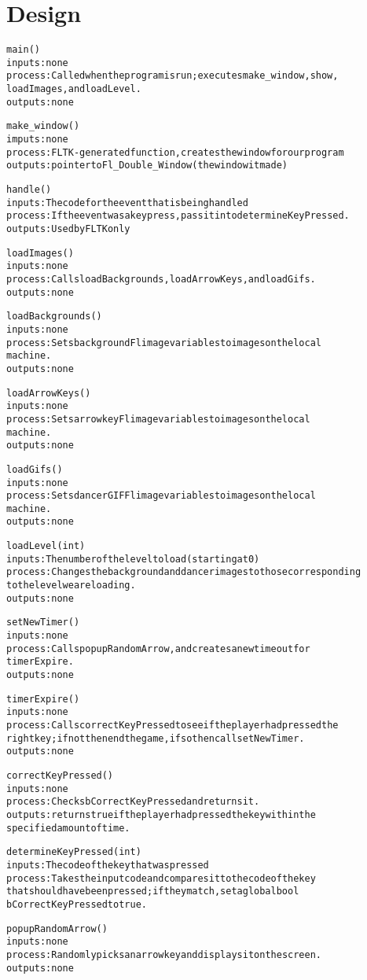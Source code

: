 \documentclass{article}
\begin{document}
\section*{Design}

\begin{alltt}
main()
	inputs: none
	process: Called when the program is run; executes make_window, show,
		loadImages, and loadLevel.
	outputs: none

make_window()
	imputs: none
	process: FLTK-generated function, creates the window for our program
	outputs: pointer to Fl_Double_Window (the window it made)

handle()
	inputs: The code for the event that is being handled
	process: If the event was a keypress, pass it into determineKeyPressed.
	outputs: Used by FLTK only

loadImages()
	inputs: none
	process: Calls loadBackgrounds, loadArrowKeys, and loadGifs.
	outputs: none
\end{alltt}

\clearpage

\begin{alltt}
loadBackgrounds()
	inputs: none
	process: Sets background Fl image variables to images on the local
		machine.
	outputs: none

loadArrowKeys()
	inputs: none
	process: Sets arrow key Fl image variables to images on the local
		machine.
	outputs: none

loadGifs()
	inputs: none
	process: Sets dancer GIF Fl image variables to images on the local
		machine.
	outputs: none

loadLevel(int)
	inputs: The number of the level to load (starting at 0)
	process: Changes the background and dancer images to those corresponding
		to the level we are loading.
	outputs: none
\end{alltt}

\clearpage

\begin{alltt}
setNewTimer()
	inputs: none
	process: Calls popupRandomArrow, and creates a new timeout for 
		timerExpire.
	outputs: none

timerExpire()
	inputs: none
	process: Calls correctKeyPressed to see if the player had pressed the 
		right key; if not then end the game, if so then call setNewTimer.
	outputs: none

correctKeyPressed()
	inputs: none
	process: Checks bCorrectKeyPressed and returns it.
	outputs: returns true if the player had pressed the key within the 
		specified amount of time.

determineKeyPressed(int)
	inputs: The code of the key that was pressed
	process: Takes the input code and compares it to the code of the key 
		that should have been pressed; if they match, set a global bool
		bCorrectKeyPressed to true.

popupRandomArrow()
	inputs: none
	process: Randomly picks an arrow key and displays it on the screen.
	outputs: none
\end{alltt}
\end{document}
